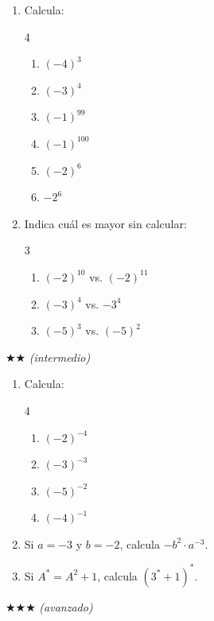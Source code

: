 \documentclass[11pt, letterpaper]{article}
\begin{document}
\begin{enumerate}[label=\textbf{\arabic*.}, leftmargin=*]
  \item Calcula:
  \begin{multicols}{4}
  \begin{enumerate}[label=\alph*)]
    \item $(-4)^3$
    \item $(-3)^4$
    \item $(-1)^{99}$
    \item $(-1)^{100}$
    \item $(-2)^6$
    \item $-2^6$
  \end{enumerate}
  \end{multicols}

  \item Indica cu\'al es mayor sin calcular:
  \begin{multicols}{3}
  \begin{enumerate}[label=\alph*)]
    \item $(-2)^{10}$ vs. $(-2)^{11}$
    \item $(-3)^4$ vs. $-3^4$
    \item $(-5)^3$ vs. $(-5)^2$
  \end{enumerate}
  \end{multicols}
\end{enumerate}

$\bigstar\bigstar$ \textit{(intermedio)}

\begin{enumerate}[label=\textbf{\arabic*.}, leftmargin=*, resume]
  \item Calcula:
  \begin{multicols}{4}
  \begin{enumerate}[label=\alph*)]
    \item $(-2)^{-4}$
    \item $(-3)^{-3}$
    \item $(-5)^{-2}$
    \item $(-4)^{-1}$
  \end{enumerate}
  \end{multicols}

  \item Si $a=-3$ y $b=-2$, calcula $-b^2\cdot a^{-3}$.

  \item Si $A^*=A^2+1$, calcula $(3^*+1)^*$.
\end{enumerate}

$\bigstar\bigstar\bigstar$ \textit{(avanzado)}
\end{document}
